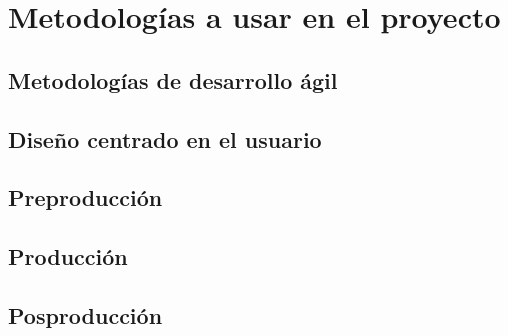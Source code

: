 \chapter{Metodologías a usar en el proyecto}
\label{ch:metodologias}

\section{Metodologías de desarrollo ágil}

\section{Diseño centrado en el usuario}

\section{Preproducción}

\section{Producción}

\section{Posproducción}
